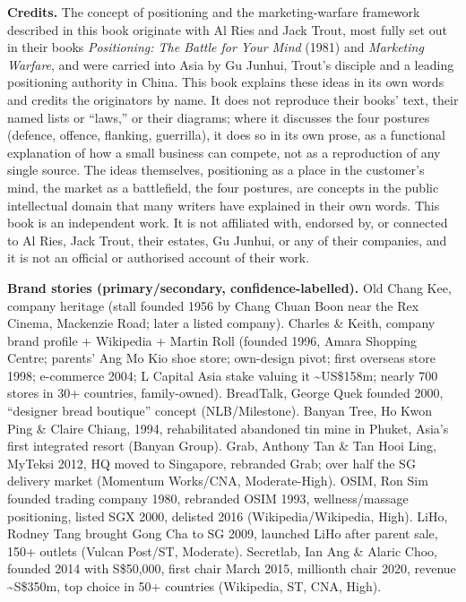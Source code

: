 \documentclass[10pt,twoside,openany]{memoir}
\begin{document}
{{{{{\textbf{Credits.} The concept of positioning and the marketing-warfare
framework described in this book originate with Al Ries and Jack Trout,
most fully set out in their books \emph{Positioning: The Battle for Your
Mind} (1981) and \emph{Marketing Warfare}, and were carried into Asia by
Gu Junhui, Trout's disciple and a leading positioning authority in
China. This book explains these ideas in its own words and credits the
originators by name. It does not reproduce their books' text, their
named lists or ``laws,'' or their diagrams; where it discusses the four
postures (defence, offence, flanking, guerrilla), it does so in its own
prose, as a functional explanation of how a small business can compete,
not as a reproduction of any single source. The ideas themselves,
positioning as a place in the customer's mind, the market as a
battlefield, the four postures, are concepts in the public intellectual
domain that many writers have explained in their own words. This book is
an independent work. It is not affiliated with, endorsed by, or
connected to Al Ries, Jack Trout, their estates, Gu Junhui, or any of
their companies, and it is not an official or authorised account of
their work.

\textbf{Brand stories (primary/secondary, confidence-labelled).} Old
Chang Kee, company heritage (stall founded 1956 by Chang Chuan Boon near
the Rex Cinema, Mackenzie Road; later a listed company). Charles \&
Keith, company brand profile + Wikipedia + Martin Roll (founded 1996,
Amara Shopping Centre; parents' Ang Mo Kio shoe store; own-design pivot;
first overseas store 1998; e-commerce 2004; L Capital Asia stake valuing
it \textasciitilde US\$158m; nearly 700 stores in 30+ countries,
family-owned). BreadTalk, George Quek founded 2000, ``designer bread
boutique'' concept (NLB/Milestone). Banyan Tree, Ho Kwon Ping \& Claire
Chiang, 1994, rehabilitated abandoned tin mine in Phuket, Asia's first
integrated resort (Banyan Group). Grab, Anthony Tan \& Tan Hooi Ling,
MyTeksi 2012, HQ moved to Singapore, rebranded Grab; over half the SG
delivery market (Momentum Works/CNA, Moderate-High). OSIM, Ron Sim
founded trading company 1980, rebranded OSIM 1993, wellness/massage
positioning, listed SGX 2000, delisted 2016 (Wikipedia/Wikipedia, High).
LiHo, Rodney Tang brought Gong Cha to SG 2009, launched LiHo after
parent sale, 150+ outlets (Vulcan Post/ST, Moderate). Secretlab, Ian Ang
\& Alaric Choo, founded 2014 with S\$50,000, first chair March 2015,
millionth chair 2020, revenue \textasciitilde S\$350m, top choice in 50+
countries (Wikipedia, ST, CNA, High).

}}}}}
\end{document}
